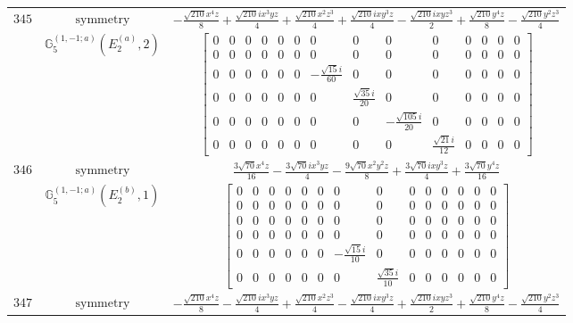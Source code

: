 \documentclass[fleqn,8pt,landscape]{jsarticle}
\begin{document}
\begin{longtable}{ccc}
$ 345 $ & $ \text{symmetry} $ & $ - \frac{\sqrt{210} x^{4} z}{8} + \frac{\sqrt{210} i x^{3} y z}{4} + \frac{\sqrt{210} x^{2} z^{3}}{4} + \frac{\sqrt{210} i x y^{3} z}{4} - \frac{\sqrt{210} i x y z^{3}}{2} + \frac{\sqrt{210} y^{4} z}{8} - \frac{\sqrt{210} y^{2} z^{3}}{4} $ \\
$  $ & $ \mathbb{G}_{5}^{(1,-1;a)}(E_{2}^{(a)},2) $ & $ \begin{bmatrix} 0 & 0 & 0 & 0 & 0 & 0 & 0 & 0 & 0 & 0 & 0 & 0 & 0 & 0 \\ 0 & 0 & 0 & 0 & 0 & 0 & 0 & 0 & 0 & 0 & 0 & 0 & 0 & 0 \\ 0 & 0 & 0 & 0 & 0 & 0 & - \frac{\sqrt{15} i}{60} & 0 & 0 & 0 & 0 & 0 & 0 & 0 \\ 0 & 0 & 0 & 0 & 0 & 0 & 0 & \frac{\sqrt{35} i}{20} & 0 & 0 & 0 & 0 & 0 & 0 \\ 0 & 0 & 0 & 0 & 0 & 0 & 0 & 0 & - \frac{\sqrt{105} i}{20} & 0 & 0 & 0 & 0 & 0 \\ 0 & 0 & 0 & 0 & 0 & 0 & 0 & 0 & 0 & \frac{\sqrt{21} i}{12} & 0 & 0 & 0 & 0 \end{bmatrix} $ \\ \hline
$ 346 $ & $ \text{symmetry} $ & $ \frac{3 \sqrt{70} x^{4} z}{16} - \frac{3 \sqrt{70} i x^{3} y z}{4} - \frac{9 \sqrt{70} x^{2} y^{2} z}{8} + \frac{3 \sqrt{70} i x y^{3} z}{4} + \frac{3 \sqrt{70} y^{4} z}{16} $ \\
$  $ & $ \mathbb{G}_{5}^{(1,-1;a)}(E_{2}^{(b)},1) $ & $ \begin{bmatrix} 0 & 0 & 0 & 0 & 0 & 0 & 0 & 0 & 0 & 0 & 0 & 0 & 0 & 0 \\ 0 & 0 & 0 & 0 & 0 & 0 & 0 & 0 & 0 & 0 & 0 & 0 & 0 & 0 \\ 0 & 0 & 0 & 0 & 0 & 0 & 0 & 0 & 0 & 0 & 0 & 0 & 0 & 0 \\ 0 & 0 & 0 & 0 & 0 & 0 & 0 & 0 & 0 & 0 & 0 & 0 & 0 & 0 \\ 0 & 0 & 0 & 0 & 0 & 0 & - \frac{\sqrt{15} i}{10} & 0 & 0 & 0 & 0 & 0 & 0 & 0 \\ 0 & 0 & 0 & 0 & 0 & 0 & 0 & \frac{\sqrt{35} i}{10} & 0 & 0 & 0 & 0 & 0 & 0 \end{bmatrix} $ \\ \hline
$ 347 $ & $ \text{symmetry} $ & $ - \frac{\sqrt{210} x^{4} z}{8} - \frac{\sqrt{210} i x^{3} y z}{4} + \frac{\sqrt{210} x^{2} z^{3}}{4} - \frac{\sqrt{210} i x y^{3} z}{4} + \frac{\sqrt{210} i x y z^{3}}{2} + \frac{\sqrt{210} y^{4} z}{8} - \frac{\sqrt{210} y^{2} z^{3}}{4} $ \\

\end{longtable}
\end{document}

